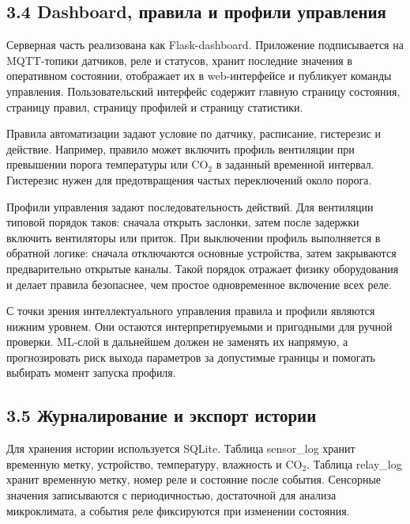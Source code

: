 \documentclass[a4paper,14pt]{extarticle}
\renewcommand{\texttt}[1]{\textnormal{#1}}
\begin{document}
\subsection{3.4 Dashboard, правила и профили
управления}\label{dashboard-ux43fux440ux430ux432ux438ux43bux430-ux438-ux43fux440ux43eux444ux438ux43bux438-ux443ux43fux440ux430ux432ux43bux435ux43dux438ux44f}

Серверная часть реализована как Flask-dashboard. Приложение
подписывается на MQTT-топики датчиков, реле и статусов, хранит последние
значения в оперативном состоянии, отображает их в web-интерфейсе и
публикует команды управления. Пользовательский интерфейс содержит
главную страницу состояния, страницу правил, страницу профилей и
страницу статистики.

Правила автоматизации задают условие по датчику, расписание, гистерезис
и действие. Например, правило может включить профиль вентиляции при
превышении порога температуры или CO\(_2\) в заданный временной
интервал. Гистерезис нужен для предотвращения частых переключений около
порога.

Профили управления задают последовательность действий. Для вентиляции
типовой порядок таков: сначала открыть заслонки, затем после задержки
включить вентиляторы или приток. При выключении профиль выполняется в
обратной логике: сначала отключаются основные устройства, затем
закрываются предварительно открытые каналы. Такой порядок отражает
физику оборудования и делает правила безопаснее, чем простое
одновременное включение всех реле.

С точки зрения интеллектуального управления правила и профили являются
нижним уровнем. Они остаются интерпретируемыми и пригодными для ручной
проверки. ML-слой в дальнейшем должен не заменять их напрямую, а
прогнозировать риск выхода параметров за допустимые границы и помогать
выбирать момент запуска профиля.

\subsection{3.5 Журналирование и экспорт
истории}\label{ux436ux443ux440ux43dux430ux43bux438ux440ux43eux432ux430ux43dux438ux435-ux438-ux44dux43aux441ux43fux43eux440ux442-ux438ux441ux442ux43eux440ux438ux438}

Для хранения истории используется SQLite. Таблица \texttt{sensor\_log}
хранит временную метку, устройство, температуру, влажность и CO\(_2\).
Таблица \texttt{relay\_log} хранит временную метку, номер реле и
состояние после события. Сенсорные значения записываются с
периодичностью, достаточной для анализа микроклимата, а события реле
фиксируются при изменении состояния.
\end{document}

